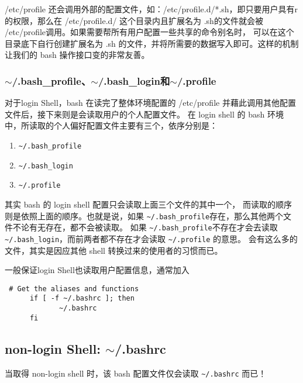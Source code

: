 /etc/profile 还会调用外部的配置文件，如：/etc/profile.d/*.sh，即只要用户具有r的权限，那么在 /etc/profile.d/ 这个目录内且扩展名为 .sh的文件就会被 /etc/profile调用。如果需要帮所有用户配置一些共享的命令别名时， 可以在这个目录底下自行创建扩展名为 .sh 的文件，并将所需要的数据写入即可。这样的机制让我们的 bash 操作接口变的非常友善。


\subsubsection{$\sim$/.bash\_profile、$\sim$/.bash\_login和$\sim$/.profile}
对于login Shell，bash 在读完了整体环境配置的 /etc/profile 并藉此调用其他配置文件后，接下来则是会读取用户的个人配置文件。 在 login shell 的 bash 环境中，所读取的个人偏好配置文件主要有三个，依序分别是：
\begin{enumerate}
\item \verb|~/.bash_profile|
\item \verb|~/.bash_login|
\item \verb|~/.profile|
\end{enumerate}

其实 bash 的 login shell 配置只会读取上面三个文件的其中一个， 而读取的顺序则是依照上面的顺序。也就是说，如果 \verb|~/.bash_profile|存在，那么其他两个文件不论有无存在，都不会被读取。 如果 \verb|~/.bash_profile|不存在才会去读取 \verb|~/.bash_login|，而前两者都不存在才会读取 \verb|~/.profile| 的意思。 会有这么多的文件，其实是因应其他 shell 转换过来的使用者的习惯而已。

一般保证login Shell也读取用户配置信息，通常加入
\begin{verbatim}
 # Get the aliases and functions
      if [ -f ~/.bashrc ]; then
             ~/.bashrc
      fi
\end{verbatim}


\subsection{non-login Shell: $\sim$/.bashrc}
当取得 non-login shell 时，该 bash 配置文件仅会读取 \verb|~/.bashrc| 而已！


